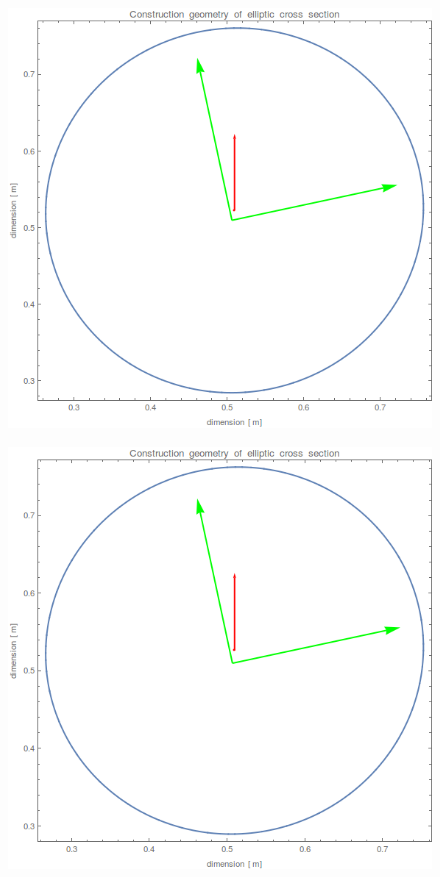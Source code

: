 \documentclass[twocolumn]{bmcart}
\begin{document}
\begin{figure}[h]
\begin{minipage}{.26\textwidth}
  \label{fig:sfig2}
\end{minipage}
\begin{minipage}{.26\textwidth}
  \centering
  \includegraphics[width=1\linewidth]{figures/V1.png}
  \label{fig:sfig3}
\end{minipage}
\begin{minipage}{.26\textwidth}
  \centering
  \includegraphics[width=1\linewidth]{figures/V06.png}

\end{minipage}
\end{figure}
\end{document}
